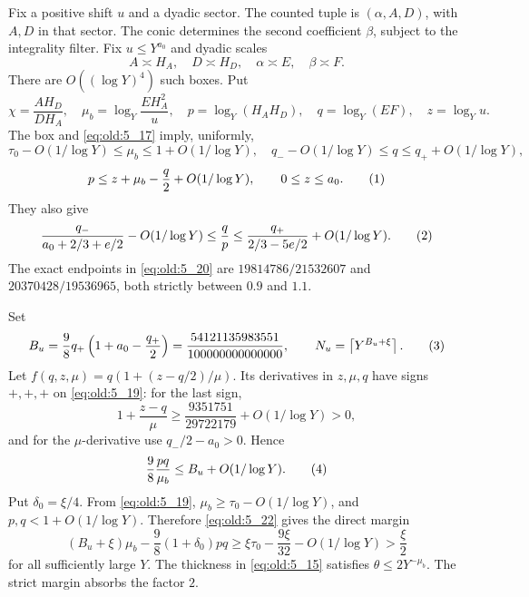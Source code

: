 Fix a positive shift \(u\) and a dyadic sector. The counted tuple
is \((\alpha,A,D)\), with \(A,D\) in that sector. The conic determines
the second coefficient \(\beta\), subject to the integrality filter.
Fix \(u\le Y^{a_0}\) and dyadic scales
\[
 A\asymp H_A,\quad D\asymp H_D,\quad
 \alpha\asymp E,\quad\beta\asymp F.
\]
There are \(O((\log Y)^4)\) such boxes. Put
\[
 \chi=\frac{A H_D}{D H_A},\quad
 \mu_b=\log_Y\frac{E H_A^2}{u},\quad
 p=\log_Y(H_AH_D),\quad q=\log_Y(EF),\quad z=\log_Yu.
\]
The box and \eqref{eq:old:5_17} imply, uniformly,
\[
 \tau_0-O(1/\log Y)\le\mu_b\le1+O(1/\log Y),\quad
 q_--O(1/\log Y)\le q\le q_++O(1/\log Y),
\]
\[
 p\le z+\mu_b-\frac q2+O(1/\log Y),\qquad 0\le z\le a_0.
\AutoTag{eq:old:5_19}
\]
They also give
\[
 \frac{q_-}{a_0+2/3+e/2}-O(1/\log Y)
 \le \frac qp \le
 \frac{q_+}{2/3-5e/2}+O(1/\log Y).
\AutoTag{eq:old:5_20}
\]
The exact endpoints in \eqref{eq:old:5_20} are
\(19814786/21532607\) and \(20370428/19536965\), both strictly between
\(0.9\) and \(1.1\).

Set
\[
 B_u=\frac98q_+\left(1+a_0-\frac{q_+}{2}\right)
 =\frac{54121135983551}{100000000000000},\qquad
 N_u=\left\lceil Y^{B_u+\xi}\right\rceil .
\AutoTag{eq:old:5_21}
\]
Let \(f(q,z,\mu)=q(1+(z-q/2)/\mu)\). Its derivatives in \(z,\mu,q\)
have signs \(+,+,+\) on \eqref{eq:old:5_19}: for the last sign,
\[
 1+\frac{z-q}{\mu}\ge
 \frac{9351751}{29722179}+O(1/\log Y)>0,
\]
and for the \(\mu\)-derivative use \(q_-/2-a_0>0\). Hence
\[
 \frac98\frac{pq}{\mu_b}\le B_u+O(1/\log Y).
\AutoTag{eq:old:5_22}
\]
Put \(\delta_0=\xi/4\). From \eqref{eq:old:5_19}, \(\mu_b\ge\tau_0-O(1/\log Y)\),
and \(p,q<1+O(1/\log Y)\). Therefore \eqref{eq:old:5_22} gives the direct margin
\[
(B_u+\xi)\mu_b-\frac98(1+\delta_0)pq
\ge \xi\tau_0-\frac{9\xi}{32}-O(1/\log Y)>\frac{\xi}{2}
\]
for all sufficiently large \(Y\).
The thickness in \eqref{eq:old:5_15} satisfies
\(\theta\le2Y^{-\mu_b}\). The strict margin absorbs the factor
\(2\).

